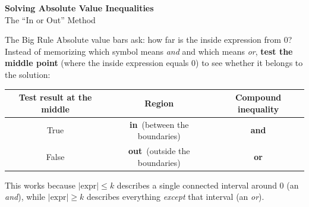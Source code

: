 \documentclass[11pt]{article}
\newcommand{\In}{\textbf{\color{FangGreen}in}}
\newcommand{\Out}{\textbf{\color{FangRed}out}}
\begin{document}
\begin{center}
  {\color{FangBlue}\LARGE\bfseries Solving Absolute Value Inequalities}\\[3pt]
  {\color{FangBlue}\large The ``In or Out'' Method}
\end{center}
\vspace{4pt}

\begin{stepbox}{The Big Rule}
Absolute value bars ask: how far is the inside expression from $0$? Instead of memorizing which symbol
means \emph{and} and which means \emph{or}, \textbf{test the middle point} (where the inside expression
equals $0$) to see whether it belongs to the solution:
\begin{center}
\renewcommand{\arraystretch}{1.3}
\begin{tabular}{|c|c|c|}
\hline
\textbf{Test result at the middle} & \textbf{Region} & \textbf{Compound inequality} \\\hline
True & \In\ (between the boundaries) & \textbf{and} \\\hline
False & \Out\ (outside the boundaries) & \textbf{or} \\\hline
\end{tabular}
\end{center}
This works because $\lvert \text{expr}\rvert \le k$ describes a single connected interval around $0$
(an \emph{and}), while $\lvert \text{expr}\rvert \ge k$ describes everything \emph{except} that interval
(an \emph{or}).
\end{stepbox}

\vspace{4pt}
\vspace{2pt}
\end{document}
